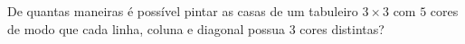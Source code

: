 De quantas maneiras é possível pintar as casas de um tabuleiro $3 \times 3$ com $5$ cores de modo que cada linha, coluna e diagonal possua $3$ cores distintas?
